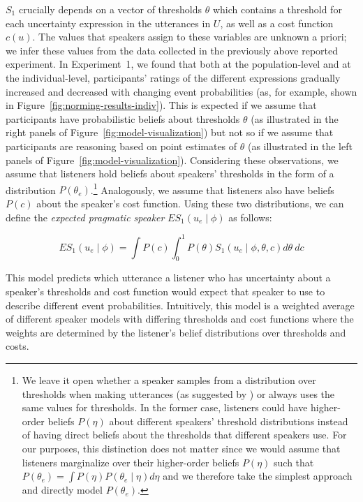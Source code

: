 \documentclass[man, floatsintext]{apa6}
\begin{document}
$S_1$ crucially depends on a vector of thresholds $\theta$ which contains a threshold for each uncertainty expression in the utterances in $U$, 
as well as  a cost function $c(u)$. The values that speakers assign 
to these variables are unknown a priori; we infer these values from the data collected in the previously above reported experiment. In Experiment~1, we found that both at the population-level and at the individual-level, 
participants' ratings of the different expressions gradually increased and decreased with changing event probabilities 
(as, for example, shown in Figure~\ref{fig:norming-results-indiv}). This is expected if we assume that participants
have probabilistic beliefs about thresholds $\theta$ (as illustrated in the right panels of Figure~\ref{fig:model-visualization}) but not so if we assume that
participants are reasoning based on point estimates of $\theta$ (as illustrated in the left panels of Figure~\ref{fig:model-visualization}).
Considering these observations,  we assume that listeners hold beliefs about speakers' thresholds  in the form of a distribution $P\left(\theta_e\right)$.\footnote{We leave it open 
whether a speaker samples from a distribution over thresholds when making utterances (as suggested by \textcite{Qing2015}) 
or always uses the same values for thresholds. In the former case, listeners could have higher-order beliefs  $P(\eta)$ 
about different speakers' threshold distributions instead of having direct beliefs about the thresholds that different 
speakers use. For our purposes, this distinction does not matter since we would assume that listeners marginalize over their higher-order beliefs $P(\eta)$ such that  $P\left(\theta_e\right) = \int P\left(\eta\right) P\left(\theta_e \mid \eta\right) d\eta$ and we therefore take the simplest approach and directly model $P\left(\theta_e\right)$. } Analogously, we assume that listeners also have beliefs $P(c)$ about the speaker's cost function.
Using these two distributions, we can define the \textit{expected pragmatic speaker} $ES_1\left(u_e \mid \phi \right)$ as follows:

$$ES_1\left(u_e \mid \phi \right) = \int P(c) \int_0^1 P(\theta) S_1\left(u _e\mid \phi, \theta, c\right) d\theta \  d c$$

This model predicts which utterance a listener who has uncertainty about a speaker's thresholds and cost function would expect that speaker to use to describe different event probabilities.
Intuitively, this model is a weighted average of different speaker models with differing thresholds and cost functions where the weights are determined by the listener's belief distributions over thresholds
and costs. 
\end{document}
